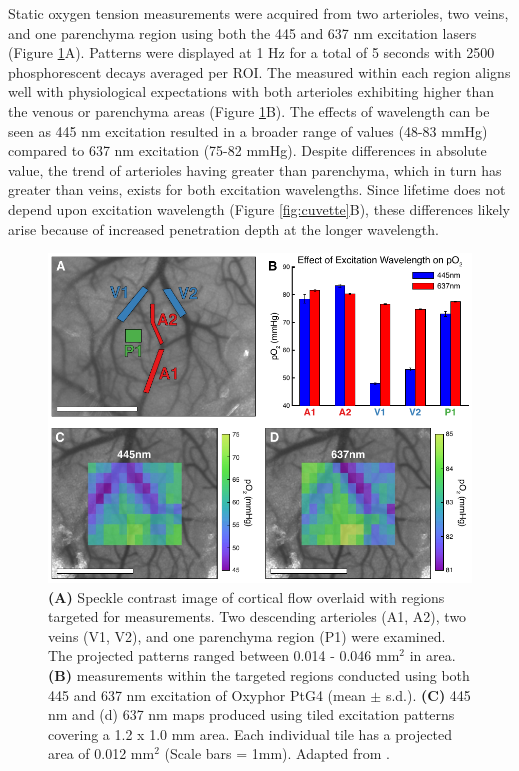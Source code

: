 Static oxygen tension measurements were acquired from two arterioles, two veins, and one parenchyma region using both the 445 and 637 nm excitation lasers (Figure \ref{fig:staticpO2}A). Patterns were displayed at 1 Hz for a total of 5 seconds with 2500 phosphorescent decays averaged per ROI. The measured  within each region aligns well with physiological expectations with both arterioles exhibiting higher  than the venous or parenchyma areas (Figure \ref{fig:staticpO2}B). The effects of wavelength can be seen as 445 nm excitation resulted in a broader range of  values (48-83 mmHg) compared to 637 nm excitation (75-82 mmHg). Despite differences in absolute value, the trend of arterioles having greater  than parenchyma, which in turn has greater  than veins, exists for both excitation wavelengths. Since lifetime does not depend upon excitation wavelength (Figure \ref{fig:cuvette}B), these differences likely arise because of increased penetration depth at the longer wavelength.

\begin{figure}
    \includegraphics{figures/chapter_2/staticpO2.pdf}
    \caption[Static \textit{in vivo} measurements of cortical oxygen tension.]{
        \label{fig:staticpO2}
        \textbf{(A)} Speckle contrast image of cortical flow overlaid with regions targeted for  measurements. Two descending arterioles (A1, A2), two veins (V1, V2), and one parenchyma region (P1) were examined. The projected patterns ranged between 0.014 - 0.046 mm$^2$ in area. \textbf{(B)}  measurements within the targeted regions conducted using both 445 and 637 nm excitation of Oxyphor PtG4 (mean $\pm$ s.d.). \textbf{(C)} 445 nm and (d) 637 nm  maps produced using tiled excitation patterns covering a 1.2 x 1.0 mm area. Each individual tile has a projected area of 0.012 mm$^2$ (Scale bars = 1mm). Adapted from \cite{Sullender:2018ff}.
    }
\end{figure}

